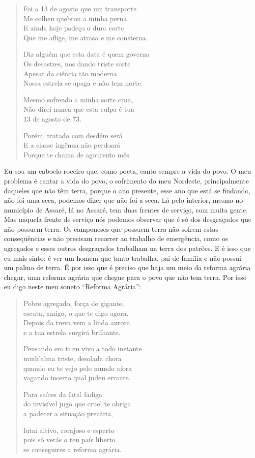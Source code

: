 \begin{verse}
Foi a 13 de agosto que um transporte\\
Me colheu quebrou a minha perna\\
E ainda hoje padeço o duro corte\\
Que me aflige, me atrasa e me consterna.

Diz alguém que esta data é quem governa\\
Os desastres, nos dando triste sorte\\
Apesar da ciência tão moderna\\
Nossa estrela se apaga e não tem norte.

Mesmo sofrendo a minha sorte crua,\\
Não direi nunca que esta culpa é tua\\
13 de agosto de 73.

Porém, tratado com desdém será\\
E a classe ingênua não perdoará\\
Porque te chama de agourento mês.
\end{verse}

Eu sou um caboclo roceiro que, como poeta, canto sempre a vida do
povo. O meu problema é cantar a vida do povo, o sofrimento do meu
Nordeste, principalmente daqueles que não têm terra, porque o ano
presente, esse ano que está se findando, não foi uma seca, podemos dizer
que não foi a seca. Lá pelo interior, mesmo no município de Assaré, lá
no Assaré, tem duas frentes de serviço, com muita gente. Mas naquela
frente de serviço nós podemos observar que é só dos desgraçados que
não possuem terra. Os camponeses que possuem terra não sofrem estas
conseqüências e não precisam recorrer ao trabalho de emergência, como
os agregados e esses outros desgraçados trabalham na terra dos patrões.
E é isso que eu mais sinto: é ver um homem que tanto trabalha, pai de
família e não possui um palmo de terra. É por isso que é preciso que
haja um meio da reforma agrária chegar, uma reforma agrária que chegue para o povo que não tem terra. Por isso eu digo neste meu soneto
``Reforma Agrária'':

\begin{verse}
Pobre agregado, força de gigante,\\
escuta, amigo, o que te digo agora.\\
Depois da treva vem a linda aurora\\
e a tua estrela surgirá brilhante.

Pensando em ti eu vivo a todo instante\\
minh'alma triste, desolada chora\\
quando eu te vejo pelo mundo afora\\
vagando incerto qual judeu errante.

Para saíres da fatal fadiga\\
do invisível jugo que cruel te obriga\\
a padecer a situação precária,

lutai altivo, corajoso e esperto\\
pois só verás o teu país liberto\\
se conseguires a reforma agrária.
\end{verse}

